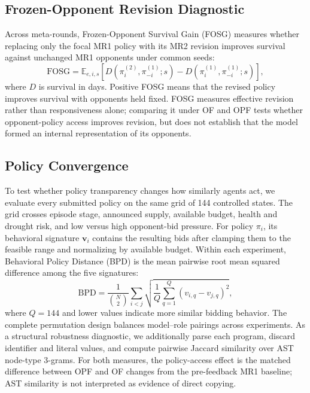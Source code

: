 \documentclass[letterpaper]{article} %
\begin{document}
\subsection{Frozen-Opponent Revision Diagnostic}

Across meta-rounds, Frozen-Opponent Survival Gain (FOSG) measures whether
replacing only the focal MR1 policy with its MR2 revision improves
survival against unchanged MR1 opponents under common seeds:
\begin{equation}
    \mathrm{FOSG}
    =
    \mathbb{E}_{e,i,s}\!\left[
        D\!\left(\pi_i^{(2)},\pi_{-i}^{(1)};s\right)
        -D\!\left(\pi_i^{(1)},\pi_{-i}^{(1)};s\right)
    \right],
\end{equation}
where $D$ is survival in days. Positive FOSG means that the revised policy
improves survival with opponents held fixed. FOSG measures effective
revision rather than responsiveness alone; comparing it under OF and OPF
tests whether opponent-policy access improves revision, but does not
establish that the model formed an internal representation of its opponents.

\subsection{Policy Convergence}

To test whether policy transparency changes how similarly agents act, we
evaluate every submitted policy on the same grid of 144 controlled states.
The grid crosses episode stage, announced supply, available budget, health
and drought risk, and low versus high opponent-bid pressure. For policy
$\pi_i$, its behavioral signature $\mathbf{v}_i$ contains the resulting bids
after clamping them to the feasible range and normalizing by available
budget. Within each experiment, Behavioral Policy Distance (BPD) is the mean
pairwise root mean squared difference among the five signatures:
\begin{equation}
    \mathrm{BPD}
    =
    \frac{1}{\binom{N}{2}}
    \sum_{i<j}
    \sqrt{\frac{1}{Q}\sum_{q=1}^{Q}
    \left(v_{i,q}-v_{j,q}\right)^2},
\end{equation}
where $Q=144$ and lower values indicate more similar bidding behavior. The
complete permutation design balances model--role pairings across experiments.
As a structural robustness diagnostic, we additionally parse each program,
discard identifier and literal values, and compute pairwise Jaccard similarity
over AST node-type 3-grams. For both measures, the policy-access effect is the
matched difference between OPF and OF changes from the pre-feedback MR1
baseline; AST similarity is not interpreted as evidence of direct copying.
\end{document}
